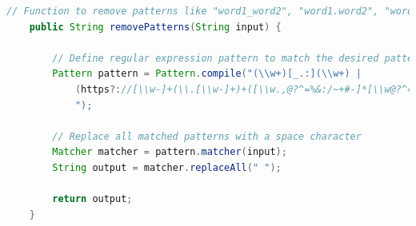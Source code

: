 \begin{lstlisting}[language=Java]
    // Function to remove patterns like "word1_word2", "word1.word2", "word1.word2", and HTTP/HTTPS URIs from a string
    public String removePatterns(String input) {

        // Define regular expression pattern to match the desired patterns
        Pattern pattern = Pattern.compile("(\\w+)[_.:](\\w+) |
            (https?://[\\w-]+(\\.[\\w-]+)+([\\w.,@?^=%&:/~+#-]*[\\w@?^=%&/~+#-])?)
            ");
            
        // Replace all matched patterns with a space character
        Matcher matcher = pattern.matcher(input);
        String output = matcher.replaceAll(" ");

        return output;
    }
\end{lstlisting}

